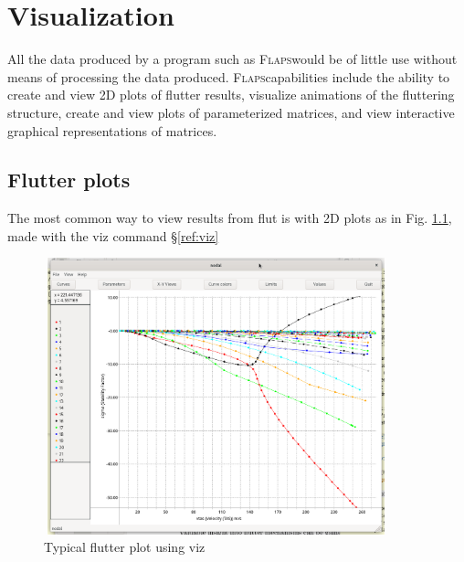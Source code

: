 \documentclass[11pt,openany,twoside]{book}
\numberwithin{equation}{section}		%
\newcommand{\Cmd}[1]{{\sf #1}}
\newcommand{\Code}[1]{{\small\tt #1}}
\newcommand{\Flaps}{\textsc{Flaps\:}}
\newcommand{\Sectref}[1]{\S\ref{#1}}
\newcommand{\Figref}[1]{Fig. \ref{#1}}  %
\begin{document}
\chapter{Visualization}\label{chap:visualization}

All the data produced by a program such as \Flaps would be of little
use without means of processing the data produced. \Flaps capabilities
include the ability to create and view 2D plots of flutter results,
visualize animations of the fluttering structure, create and view plots
of parameterized matrices, and view interactive graphical representations
of matrices.

\section{Flutter plots}\label{sect:flutter-plots}
The most common way to view results from \Cmd{flut} is with 2D
plots as in \Figref{fig:viz}, made with the \Cmd{viz} command \Sectref{ref:viz}
\begin{figure}[h]
		\includegraphics[height=8cm,width=10cm]{viz.png}
	\centering
	\caption{Typical flutter plot using \Cmd{viz}}\label{fig:viz}
\end{figure}
\end{document}
